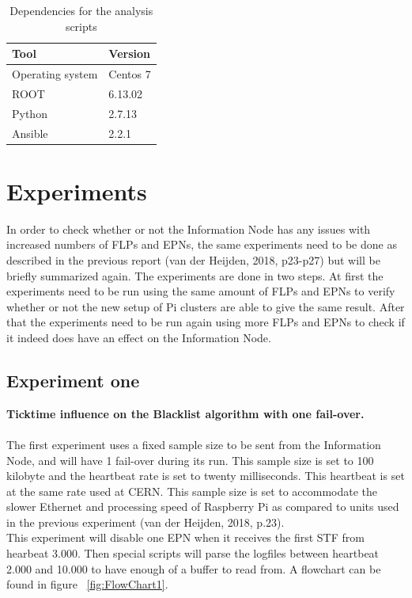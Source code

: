 \begin{table}[ht]
\begin{tabular}{| l | l |}
\hline
Tool & Version \\ \hline
Operating system & Centos 7 \\ \hline
ROOT & 6.13.02 \\ \hline
Python & 2.7.13 \\ \hline
Ansible & 2.2.1 \\ \hline
\end{tabular}
\caption{Dependencies for the analysis scripts}
\label{table:AnalysisDependencies}
\end{table}

\newpage

\section{Experiments}
In order to check whether or not the Information Node has any issues with increased numbers of FLPs and EPNs, the same experiments need to be done as described in the previous report (van der Heijden, 2018, p23-p27) but will be briefly summarized again. The experiments are done in two steps. At first the experiments need to be run using the same amount of FLPs and EPNs to verify whether or not the new setup of Pi clusters are able to give the same result. After that the experiments need to be run again using more FLPs and EPNs to check if it indeed does have an effect on the Information Node.

\subsection{Experiment one}
\textbf{Ticktime influence on the Blacklist algorithm with one fail-over.}
\\~\\
The first experiment uses a fixed sample size to be sent from the Information Node, and will have 1 fail-over during its run. This sample size is set to 100 kilobyte and the heartbeat rate is set to twenty milliseconds. This heartbeat is set at the same rate used at CERN. This sample size is set to accommodate the slower Ethernet and processing speed of Raspberry Pi as compared to units used in the previous experiment (van der Heijden, 2018, p.23). \\
This experiment will disable one EPN when it receives the first STF from hearbeat 3.000. Then special scripts will parse the logfiles between heartbeat 2.000 and 10.000 to have enough of a buffer to read from. A flowchart can be found in figure ~\ref{fig:FlowChart1}.

